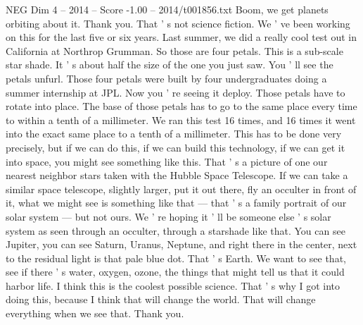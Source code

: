 \begin{textsample}{NEG Dim 4 – 2014 – Score -1.00 – 2014/t001856.txt}
Boom, we get planets orbiting about it.
Thank you.
That ' s not science fiction.
We ' ve been working on this for the last five or six years.
Last summer, we did a really cool test out in California at Northrop Grumman.
So those are four petals.
This is a sub-scale star shade.
It ' s about half the size of the one you just saw.
You ' ll see the petals unfurl.
Those four petals were built by four undergraduates doing a summer internship at JPL.
Now you ' re seeing it deploy.
Those petals have to rotate into place.
The base of those petals has to go to the same place every time to within a tenth of a millimeter.
We ran this test 16 times, and 16 times it went into the exact same place to a tenth of a millimeter.
This has to be done very precisely, but if we can do this, if we can build this technology, if we can get it into space, you might see something like this.
That ' s a picture of one our nearest neighbor stars taken with the Hubble Space Telescope.
If we can take a similar space telescope, slightly larger, put it out there, fly an occulter in front of it, what we might see is something like that — that ' s a family portrait of our solar system — but not ours.
We ' re hoping it ' ll be someone else ' s solar system as seen through an occulter, through a starshade like that.
You can see Jupiter, you can see Saturn, Uranus, Neptune, and right there in the center, next to the residual light is that pale blue dot.
That ' s Earth.
We want to see that, see if there ' s water, oxygen, ozone, the things that might tell us that it could harbor life.
I think this is the coolest possible science.
That ' s why I got into doing this, because I think that will change the world.
That will change everything when we see that.
Thank you.

\end{textsample}
